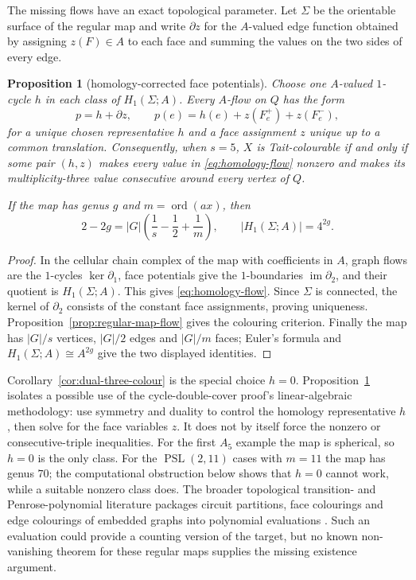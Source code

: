 \documentclass[11pt,a4paper]{article}
\newtheorem{proposition}[theorem]{Proposition}
\theoremstyle{definition}
\theoremstyle{remark}
\newcommand{\ord}{\operatorname{ord}}
\newcommand{\PSL}{\operatorname{PSL}}
\begin{document}
The missing flows have an exact topological parameter.  Let $\Sigma$ be the orientable surface of the regular map and write $\partial z$ for the $A$-valued edge function obtained by assigning $z(F)\in A$ to each face and summing the values on the two sides of every edge.
\begin{proposition}[homology-corrected face potentials]\label{prop:homology-flow}
Choose one $A$-valued $1$-cycle $h$ in each class of $H_1(\Sigma;A)$.  Every $A$-flow on $Q$ has the form
\begin{equation}\label{eq:homology-flow}
 p=h+\partial z,
 \qquad p(e)=h(e)+z(F_e^+)+z(F_e^-),
\end{equation}
for a unique chosen representative $h$ and a face assignment $z$ unique up to a common translation.  Consequently, when $s=5$, $X$ is Tait-colourable if and only if some pair $(h,z)$ makes every value in \eqref{eq:homology-flow} nonzero and makes its multiplicity-three value consecutive around every vertex of $Q$.

If the map has genus $g$ and $m=\ord(ax)$, then
\[
 2-2g=|G|\left(\frac1s-\frac12+\frac1m\right),
 \qquad |H_1(\Sigma;A)|=4^{2g}.
\]
\end{proposition}
\begin{proof}
In the cellular chain complex of the map with coefficients in $A$, graph flows are the $1$-cycles $\ker\partial_1$, face potentials give the $1$-boundaries $\operatorname{im}\partial_2$, and their quotient is $H_1(\Sigma;A)$.  This gives \eqref{eq:homology-flow}.  Since $\Sigma$ is connected, the kernel of $\partial_2$ consists of the constant face assignments, proving uniqueness.  Proposition~\ref{prop:regular-map-flow} gives the colouring criterion.  Finally the map has $|G|/s$ vertices, $|G|/2$ edges and $|G|/m$ faces; Euler's formula and $H_1(\Sigma;A)\cong A^{2g}$ give the two displayed identities.
\end{proof}

Corollary~\ref{cor:dual-three-colour} is the special choice $h=0$.  Proposition~\ref{prop:homology-flow} isolates a possible use of the cycle-double-cover proof's linear-algebraic methodology: use symmetry and duality to control the homology representative $h$, then solve for the face variables $z$.  It does not by itself force the nonzero or consecutive-triple inequalities.  For the first $A_5$ example the map is spherical, so $h=0$ is the only class.  For the $\PSL(2,11)$ cases with $m=11$ the map has genus $70$; the computational obstruction below shows that $h=0$ cannot work, while a suitable nonzero class does.  The broader topological transition- and Penrose-polynomial literature packages circuit partitions, face colourings and edge colourings of embedded graphs into polynomial evaluations \cite{EllisMonaghanMoffatt13}.  Such an evaluation could provide a counting version of the target, but no known non-vanishing theorem for these regular maps supplies the missing existence argument.
\end{document}
